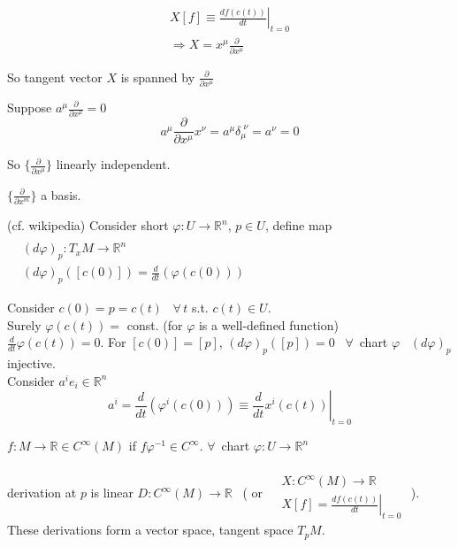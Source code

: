 \documentclass[twoside]{amsart}
\begin{document}
\[
\begin{gathered}
X[f] \equiv \left. \frac{df(c(t))}{ dt} \right|_{t=0} \\
\Longrightarrow X = x^{\mu} \frac{ \partial}{ \partial x^{\mu}} \end{gathered}
\]

So tangent vector $X$ is spanned by $\frac{ \partial }{ \partial x^{\mu} }$

Suppose $a^{\mu} \frac{ \partial }{ \partial x^{\mu} } =0$ 
\[
a^{\mu} \frac{ \partial }{ \partial x^{\mu}} x^{\nu} = a^{\mu} \delta_{\mu}^{ \, \, \nu } = a^{\nu} = 0 
\]


So $\lbrace \frac{ \partial }{ \partial x^{\mu}} \rbrace$ linearly independent.  

$\lbrace \frac{ \partial }{ \partial x^{m}} \rbrace$ a basis.  

\hrulefill

(cf. wikipedia) Consider short $\varphi : U \to \mathbb{R}^n$, $p\in U$, define map  $ \begin{aligned} & \quad \\ 
  & ( d\varphi)_p : T_x M \to \mathbb{R}^n \\ 
  & (d\varphi)_p( [c(0 ) ]) = \frac{d}{dt} ( \varphi ( c(0 )) ) \end{aligned}$ 

Consider $c(0) = p = c(t)$ \, $\forall \, t $ s.t. $c(t) \in U$.   \\
Surely $\varphi(c(t)) = $ const. (for $\varphi$ is a well-defined function)  \\
$\frac{d}{dt} \varphi(c(t)) = 0$.  For $[c(0)] = [p]$, $ (d\varphi)_p ([p ]) = 0$ \, $\forall \, $ chart $\varphi$ \, $(d\varphi)_p$ injective.  \\
Consider $a^i e_i \in \mathbb{R}^n$ 
\[
a^i = \frac{d}{dt} ( \varphi^i(c(0)) ) \equiv \left. \frac{d}{dt} x^i(c(t)) \right|_{t=0}
\]

$f: M \to \mathbb{R} \in C^{\infty}(M)$ if $f\varphi^{-1} \in C^{\infty}$.  $\forall \, $ chart $\varphi : U \to \mathbb{R}^n$ 

derivation at $p$ is linear $D : C^{\infty}(M) \to \mathbb{R}$ \, ( or $\begin{aligned} & \quad \\ 
  & X: C^{\infty}(M) \to \mathbb{R} \\ 
  & X[f] =\left.  \frac{df(c(t)) }{ dt} \right|_{t=0} \end{aligned}$ ).  These derivations form a vector space, tangent space $T_pM$. 
\end{document}
